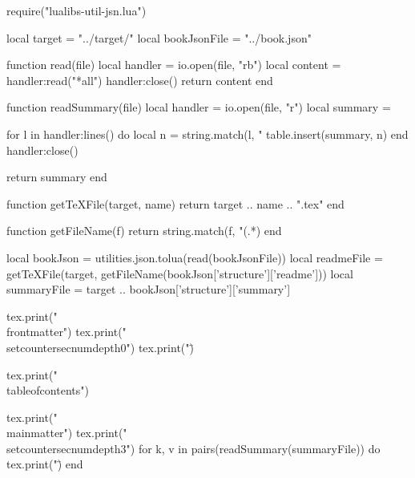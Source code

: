 \documentclass[10pt, a4paper, oneside]{ltjsbook}
\begin{document}
\begin{luacode*}
  require("lualibs-util-jsn.lua")

  local target = "../target/"
  local bookJsonFile = "../book.json"

  function read(file)
    local handler = io.open(file, "rb")
    local content = handler:read("*all")
    handler:close()
    return content
  end

  function readSummary(file)
    local handler = io.open(file, "r")
    local summary = {}

    for l in handler:lines() do
      local n = string.match(l, "%
      table.insert(summary, n)
    end
    handler:close()

    return summary
  end

  function getTeXFile(target, name)
    return target .. name .. ".tex"
  end

  function getFileName(f)
    return string.match(f, "(.*)%
  end

  local bookJson = utilities.json.tolua(read(bookJsonFile))
  local readmeFile  = getTeXFile(target, getFileName(bookJson['structure']['readme']))
  local summaryFile = target .. bookJson['structure']['summary']

  tex.print("\\frontmatter")
  tex.print("\\setcounter{secnumdepth}{0}")
  tex.print("\")

  tex.print("\\tableofcontents")

  tex.print("\\mainmatter")
  tex.print("\\setcounter{secnumdepth}{3}")
  for k, v in pairs(readSummary(summaryFile)) do
    tex.print("\")
  end
\end{luacode*}
\end{document}
